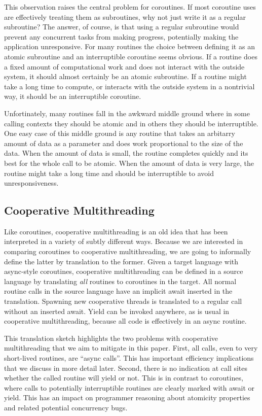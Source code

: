 \documentclass[a4paper,UKenglish,cleveref, autoref]{lipics-v2019}
\begin{document}
This observation raises the central problem for coroutines.
If most coroutine uses are effectively treating them as subroutines, why not just write it as a regular subroutine?
The answer, of course, is that using a regular subroutine would prevent any concurrent tasks from making progress, potentially making the application unresponsive.
For many routines the choice between defining it as an atomic subroutine and an interruptible coroutine seems obvious.
If a routine does a fixed amount of computational work and does not interact with the outside system, it should almost certainly be an atomic subroutine.
If a routine might take a long time to compute, or interacts with the outside system in a nontrivial way, it should be an interruptible coroutine.

Unfortinately, many routines fall in the awkward middle ground where in some calling contexts they should be atomic and in others they should be interruptible.
One easy case of this middle ground is any routine that takes an arbitarry amount of data as a parameter and does work proportional to the size of the data.
When the amount of data is small, the routine completes quickly and its best for the whole call to be atomic.
When the amount of data is very large, the routine might take a long time and should be interruptible to avoid unresponsiveness.


\subsection{Cooperative Multithreading}

Like coroutines, cooperative multithreading is an old idea that has been interpreted in a variety of subtly different ways.
Because we are interested in comparing coroutines to cooperative multithreading, we are going to informally define the latter by translation to the former.
Given a target language with async-style coroutines, cooperative multithreading can be defined in a source language by translating \emph{all} routines to coroutines in the target.
All normal routine calls in the source language have an implicit await inserted in the translation.
Spawning new cooperative threads is translated to a regular call without an inserted await.
Yield can be invoked anywhere, as is usual in cooperative multithreading, because all code is effectively in an async routine.

This translation sketch highlights the two problems with cooperative multithreading that we aim to mitigate in this paper.
First, all calls, even to very short-lived routines, are ``async calls''.
This has important efficiency implications that we discuss in more detail later.
Second, there is no indication at call sites whether the called routine will yield or not.
This is in contrast to coroutines, where calls to potentially interruptible routines are clearly marked with await or yield.
This has an impact on programmer reasoning about atomicity properties and related potential concurrency bugs.
\end{document}
